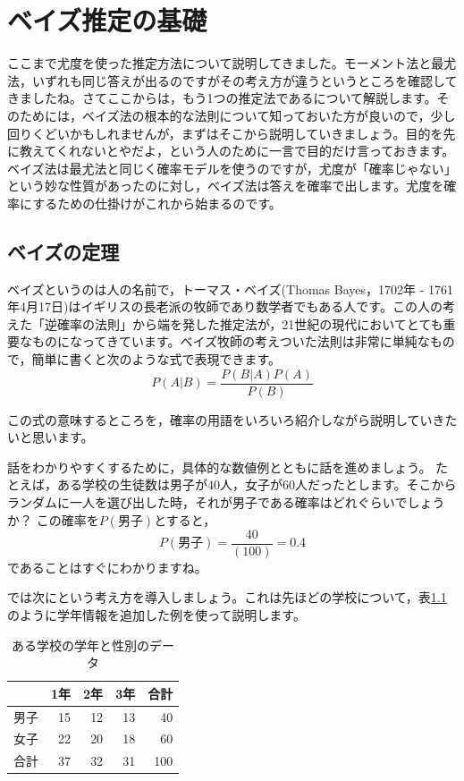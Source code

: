 \documentclass{ltjsbook}
\begin{document}
\chapter{ベイズ推定の基礎}
\label{m25_bayesian}
ここまで尤度を使った推定方法について説明してきました。モーメント法と最尤法，いずれも同じ答えが出るのですがその考え方が違うというところを確認してきましたね。さてここからは，もう1つの推定法であるについて解説します。そのためには，ベイズ法の根本的な法則について知っておいた方が良いので，少し回りくどいかもしれませんが，まずはそこから説明していきましょう。目的を先に教えてくれないとやだよ，という人のために一言で目的だけ言っておきます。ベイズ法は最尤法と同じく確率モデルを使うのですが，尤度が「確率じゃない」という妙な性質があったのに対し，ベイズ法は答えを確率で出します。尤度を確率にするための仕掛けがこれから始まるのです。

\section{ベイズの定理}
ベイズというのは人の名前で，トーマス・ベイズ(Thomas Bayes，1702年 - 1761年4月17日)はイギリスの長老派の牧師であり数学者でもある人です。この人の考えた「逆確率の法則」から端を発した推定法が，21世紀の現代においてとても重要なものになってきています。ベイズ牧師の考えついた法則は非常に単純なもので，簡単に書くと次のような式で表現できます。
\[ P(A|B) = \frac{P(B|A)P(A)}{P(B)} \]

この式の意味するところを，確率の用語をいろいろ紹介しながら説明していきたいと思います。

話をわかりやすくするために，具体的な数値例とともに話を進めましょう。
たとえば，ある学校の生徒数は男子が40人，女子が60人だったとします。そこからランダムに一人を選び出した時，それが男子である確率はどれぐらいでしょうか？ この確率を$P(\mbox{男子})$とすると，
\[P(\mbox{男子})=\frac{40}{(100)}=0.4 \]
であることはすぐにわかりますね。

では次にという考え方を導入しましょう。これは先ほどの学校について，表\ref{tbl::24_02}のように学年情報を追加した例を使って説明します。

\begin{table}[ht]
	\centering
	\caption{ある学校の学年と性別のデータ}
	\begin{tabular}{rrrrr}
		\hline
		   & 1年 & 2年 & 3年 & 合計  \\
		\hline
		男子 & 15 & 12 & 13 & 40  \\
		女子 & 22 & 20 & 18 & 60  \\\hline
		合計 & 37 & 32 & 31 & 100 \\\hline
	\end{tabular}
	\label{tbl::24_02}
\end{table}
\end{document}
